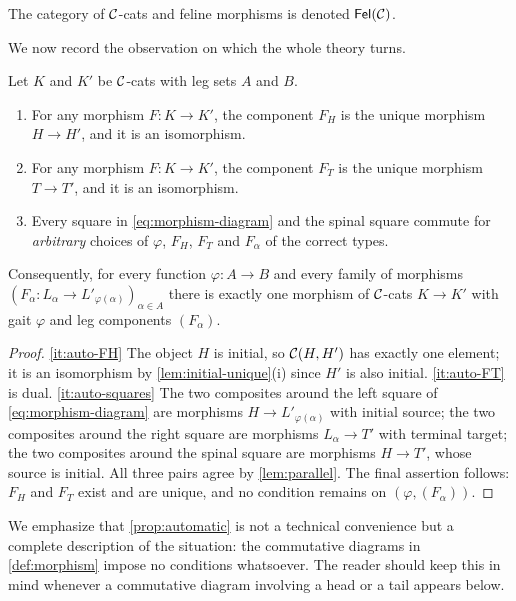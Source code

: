 \begin{definition}\label{def:Fel}
The category of $\mathcal{C}$-cats and feline morphisms is denoted $\mathsf{Fel}(\mathcal{C})$.
\end{definition}

We now record the observation on which the whole theory turns.

\begin{proposition}\label{prop:automatic}
Let $K$ and $K'$ be $\mathcal{C}$-cats with leg sets $A$ and $B$.
\begin{enumerate}
\item\label{it:auto-FH} For any morphism $F\colon K\to K'$, the component $F_H$
  is the unique morphism $H\to H'$, and it is an isomorphism.
\item\label{it:auto-FT} For any morphism $F\colon K\to K'$, the component $F_T$
  is the unique morphism $T\to T'$, and it is an isomorphism.
\item\label{it:auto-squares} Every square in \eqref{eq:morphism-diagram} and
  the spinal square commute for \emph{arbitrary} choices of $\varphi$,
  $F_H$, $F_T$ and $F_\alpha$ of the correct types.
\end{enumerate}
Consequently, for every function $\varphi\colon A\to B$ and every family of
morphisms $(F_\alpha\colon L_\alpha\to L'_{\varphi(\alpha)})_{\alpha\in A}$
there is exactly one morphism of $\mathcal{C}$-cats $K\to K'$ with gait $\varphi$ and
leg components $(F_\alpha)$.
\end{proposition}

\begin{proof}
\ref{it:auto-FH} The object $H$ is initial, so $\mathcal{C}(H,H')$ has exactly one
element; it is an isomorphism by \cref{lem:initial-unique}(i) since $H'$ is
also initial. \ref{it:auto-FT} is dual. \ref{it:auto-squares} The two
composites around the left square of \eqref{eq:morphism-diagram} are
morphisms $H\to L'_{\varphi(\alpha)}$ with initial source; the two composites
around the right square are morphisms $L_\alpha\to T'$ with terminal target;
the two composites around the spinal square are morphisms $H\to T'$, whose
source is initial. All three pairs agree by \cref{lem:parallel}. The final
assertion follows: $F_H$ and $F_T$ exist and are unique, and no condition
remains on $(\varphi,(F_\alpha))$.
\end{proof}

We emphasize that \cref{prop:automatic} is not a technical convenience but a
complete description of the situation: the commutative diagrams in
\cref{def:morphism} impose no conditions whatsoever. The reader should keep
this in mind whenever a commutative diagram involving a head or a tail
appears below.

